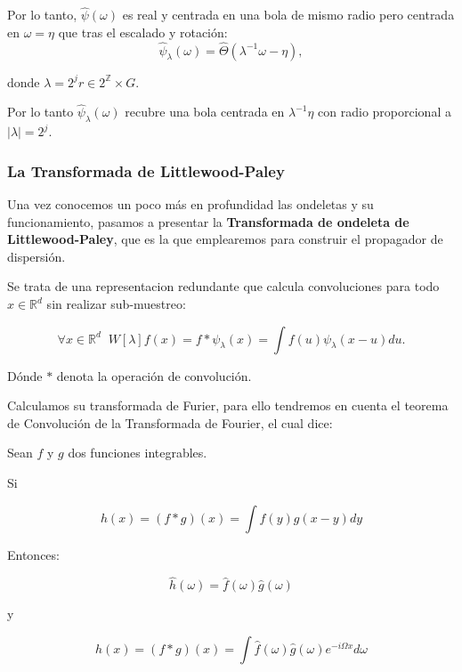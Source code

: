 \medskip

\noindent Por lo tanto, $\widehat{\psi}(\omega)$ es real y centrada en una bola de mismo radio pero centrada en $\omega=\eta$ que tras el escalado y rotación: 
$$\widehat{\psi}_\lambda(\omega)= \widehat{\Theta} (\lambda^{-1}\omega-\eta),$$ 

\noindent donde $\lambda=2^jr \in 2^{\mathbb{Z}}\times G$. 

\noindent Por lo tanto $\widehat{\psi}_\lambda(\omega)$ recubre una bola centrada en $\lambda^{-1}\eta$ con radio proporcional a $|\lambda|=2^j$.
 
\medskip 

\subsubsection{La Transformada de Littlewood-Paley}

\noindent Una vez conocemos un poco más en profundidad las ondeletas y su funcionamiento, pasamos a presentar la \textbf{Transformada de ondeleta de Littlewood-Paley}, que es la que emplearemos para construir el propagador de dispersión.

\medskip

\noindent Se trata de una representacion redundante que calcula convoluciones para todo $x \in \mathbb{R}^d$ sin realizar sub-muestreo: 

\begin{equation}
  \forall x \in  \mathbb{R}^d \;\; W[\lambda]f(x)= f \ast \psi_\lambda(x)=\int f(u)\psi_\lambda(x-u) du .
\end{equation}

\noindent Dónde $\ast$ denota la operación de convolución. 

\medskip

\noindent Calculamos su transformada de Furier, para ello tendremos en cuenta el teorema de Convolución de la Transformada de Fourier, el cual dice: 

\begin{teorema} \label{Teorema::Convolucion}
 Sean $f$ y $g$ dos funciones integrables.

 Si 

 $$h(x)=(f\ast g)(x)=\int f(y)g(x-y) dy$$

 Entonces: 

 $$\widehat{h}(\omega)=\widehat{f}(\omega) \widehat{g}(\omega)$$

 y 

 $$h(x)=(f \ast g)(x)= \int \widehat{f}(\omega) \widehat{g}(\omega) e^{-i\Omega x} d\omega$$
 
\end{teorema}

